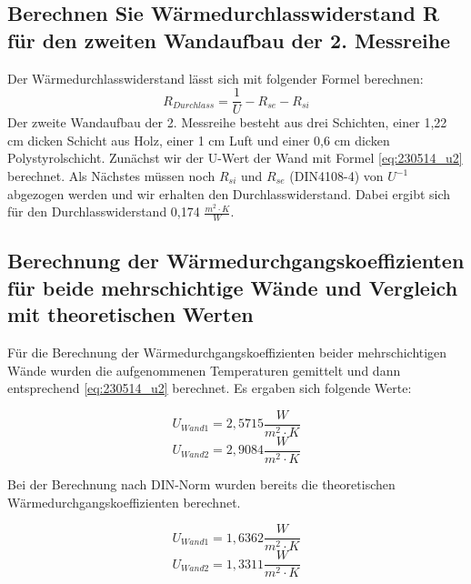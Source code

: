 \subsection{Berechnen Sie Wärmedurchlasswiderstand R für den zweiten Wandaufbau der 2. Messreihe}
Der Wärmedurchlasswiderstand lässt sich mit folgender Formel berechnen:
%
\begin{equation}
R_{Durchlass}=\frac{1} {U} - R_{se} - R_{si}
  \label{eq:230522_Wärmewiderstand}
\end{equation}
%
Der zweite Wandaufbau der 2. Messreihe besteht aus drei Schichten, einer 1,22 cm dicken Schicht aus Holz, einer 1 cm Luft und einer 0,6 cm dicken Polystyrolschicht. Zunächst wir der U-Wert der Wand mit Formel \ref{eq:230514_u2}  berechnet. Als Nächstes müssen noch $R_{si}$ und $R_{se}$ (DIN4108-4) von  $U^{-1}$ abgezogen werden und wir erhalten den Durchlasswiderstand. Dabei ergibt sich für den Durchlasswiderstand 0,174 $\frac{ m^2 \cdot K }{W}$. 


\subsection{Berechnung der Wärmedurchgangskoeffizienten für beide mehrschichtige Wände und Vergleich mit theoretischen Werten}
Für die Berechnung der Wärmedurchgangskoeffizienten beider mehrschichtigen Wände wurden die aufgenommenen Temperaturen gemittelt und dann entsprechend \autoref{eq:230514_u2} berechnet.
Es ergaben sich folgende Werte:

\begin{equation*}
  U_{Wand 1} = 2,5715 \frac{W}{m^2 \cdot K}
\end{equation*}
\begin{equation*}
  U_{Wand 2} = 2,9084 \frac{W}{m^2 \cdot K}
\end{equation*}

Bei der Berechnung nach DIN-Norm wurden bereits die theoretischen Wärmedurchgangskoeffizienten
berechnet.

\begin{equation*}
  U_{Wand 1}=1,6362 \frac{W}{m^2 \cdot K}
\end{equation*}
\begin{equation*}
  U_{Wand 2}=1,3311 \frac{W}{m^2 \cdot K}
\end{equation*}

